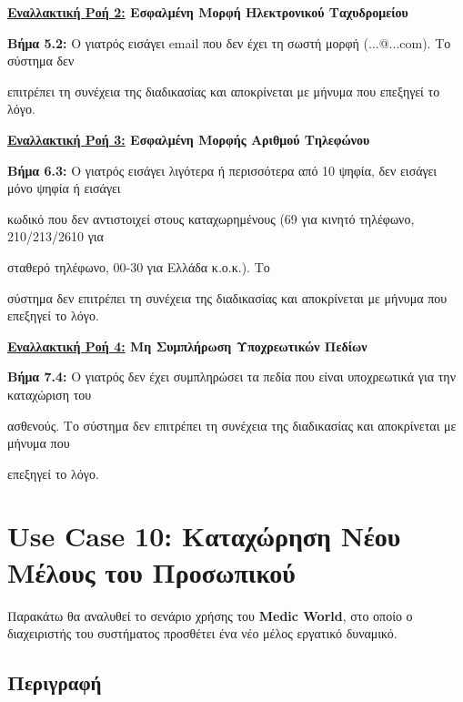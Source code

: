\documentclass{article}
\begin{document}
\textbf{\underline{Εναλλακτική Ροή 2:} Εσφαλμένη Μορφή Ηλεκτρονικού Ταχυδρομείου} \vspace{0.2cm}
\par \textbf{Βήμα 5.2:} Ο γιατρός εισάγει email που δεν έχει τη σωστή μορφή (...@...com). Το σύστημα δεν \par επιτρέπει τη συνέχεια της διαδικασίας και αποκρίνεται με μήνυμα που επεξηγεί το λόγο.  \vspace{0.2cm}

\textbf{\underline{Εναλλακτική Ροή 3:} Εσφαλμένη Μορφής Αριθμού Τηλεφώνου} \vspace{0.2cm}
\par \textbf{Βήμα 6.3:} Ο γιατρός εισάγει λιγότερα ή περισσότερα από 10 ψηφία, δεν εισάγει μόνο ψηφία ή εισάγει \par κωδικό που δεν αντιστοιχεί στους καταχωρημένους (69 για κινητό τηλέφωνο, 210/213/2610 για \par σταθερό τηλέφωνο, 00-30 για Ελλάδα κ.ο.κ.). Το \par σύστημα δεν επιτρέπει τη συνέχεια της διαδικασίας και αποκρίνεται με μήνυμα που επεξηγεί το λόγο.  \vspace{0.2cm}

\textbf{\underline{Εναλλακτική Ροή 4:} Μη Συμπλήρωση Υποχρεωτικών Πεδίων} \vspace{0.2cm}
\par \textbf{Βήμα 7.4:} Ο γιατρός δεν έχει συμπληρώσει τα πεδία που είναι υποχρεωτικά για την καταχώριση του \par ασθενούς. Το σύστημα δεν επιτρέπει τη συνέχεια της διαδικασίας και αποκρίνεται με μήνυμα που \par επεξηγεί το λόγο.  \vspace{0.2cm}

 \section{Use Case 10: Καταχώρηση Νέου Μέλους του Προσωπικού}

Παρακάτω θα αναλυθεί το σενάριο χρήσης του \textbf{Medic World}, στο οποίο ο διαχειριστής του συστήματος προσθέτει ένα νέο μέλος εργατικό δυναμικό.

\subsection{Περιγραφή}
\end{document}
